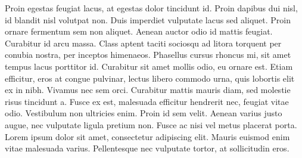 \documentclass[twoside,a4paper]{article}
\begin{document}
\begin{double}
Proin egestas feugiat lacus, at egestas dolor tincidunt id. Proin dapibus dui nisl, id blandit nisl volutpat non. Duis imperdiet vulputate lacus sed aliquet. Proin ornare fermentum sem non aliquet. Aenean auctor odio id mattis feugiat. Curabitur id arcu massa. Class aptent taciti sociosqu ad litora torquent per conubia nostra, per inceptos himenaeos. Phasellus cursus rhoncus mi, sit amet tempus lacus porttitor id. Curabitur sit amet mollis odio, eu ornare est. Etiam efficitur, eros at congue pulvinar, lectus libero commodo urna, quis lobortis elit ex in nibh. Vivamus nec sem orci.
Curabitur mattis mauris diam, sed molestie risus tincidunt a. Fusce ex est, malesuada efficitur hendrerit nec, feugiat vitae odio. Vestibulum non ultricies enim. Proin id sem velit. Aenean varius justo augue, nec vulputate ligula pretium non. Fusce ac nisi vel metus placerat porta. Lorem ipsum dolor sit amet, consectetur adipiscing elit. Mauris euismod enim vitae malesuada varius. Pellentesque nec vulputate tortor, at sollicitudin eros.
\end{double}
\end{document}
